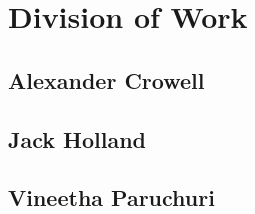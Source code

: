 \documentclass[journal]{IEEEtran}
\begin{document}
%




\appendices
\section{Division of Work}
\subsection{Alexander Crowell}
\subsection{Jack Holland}
\subsection{Vineetha Paruchuri}



%
%
%
%
\end{document}
